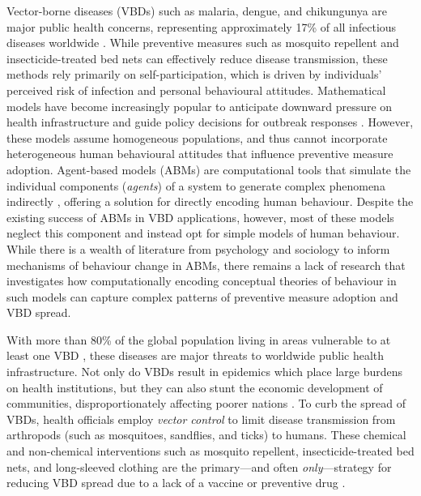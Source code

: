 Vector-borne diseases (VBDs) such as malaria, dengue, and chikungunya are major public health concerns, representing approximately 17\% of all infectious diseases worldwide \cite{world_health_organisation_who_vector-borne_2020}. While preventive measures such as mosquito repellent and insecticide-treated bed nets can effectively reduce disease transmission, these methods rely primarily on self-participation, which is driven by individuals' perceived risk of infection and personal behavioural attitudes. Mathematical models have become increasingly popular to anticipate downward pressure on health infrastructure and guide policy decisions for outbreak responses \cite{reiner_systematic_2013}. However, these models assume homogeneous populations, and thus cannot incorporate heterogeneous human behavioural attitudes that influence preventive measure adoption. Agent-based models (ABMs) are computational tools that simulate the individual components (\textit{agents}) of a system to generate complex phenomena indirectly \cite{epstein_growing_1996}, offering a solution for directly encoding human behaviour. Despite the existing success of ABMs in VBD applications, however, most of these models neglect this component and instead opt for simple models of human behaviour. While there is a wealth of literature from psychology and sociology to inform mechanisms of behaviour change in ABMs, there remains a lack of research that investigates how computationally encoding conceptual theories of behaviour in such models can capture complex patterns of preventive measure adoption and VBD spread.%

With more than 80\% of the global population living in areas vulnerable to at least one VBD \cite{golding_integrating_2015}, these diseases are major threats to worldwide public health infrastructure. Not only do VBDs result in epidemics which place large burdens on health institutions, but they can also stunt the economic development of communities, disproportionately affecting poorer nations \cite{lum_cost_2009, degroote_interventions_2018}. To curb the spread of VBDs, health officials employ \textit{vector control} to limit disease transmission from arthropods (such as mosquitoes, sandflies, and ticks) to humans. These chemical and non-chemical interventions such as mosquito repellent, insecticide-treated bed nets, and long-sleeved clothing are the primary---and often \textit{only}---strategy for reducing VBD spread due to a lack of a vaccine or preventive drug \cite{wilson_importance_2020}.

